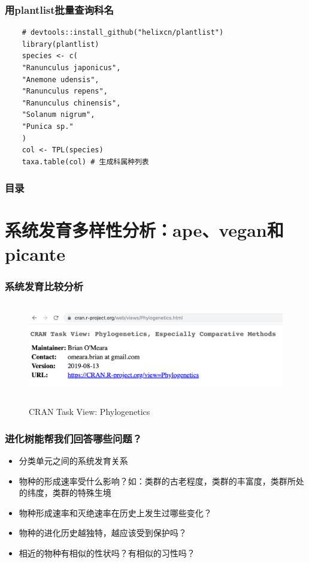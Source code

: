 \documentclass[UTF8]{ctexbeamer}
\begin{document}
    
    \begin{frame}[fragile]
    \frametitle{用plantlist批量查询科名}
     \begin{verbatim}
    # devtools::install_github("helixcn/plantlist")
    library(plantlist)
    species <- c(
    "Ranunculus japonicus",
    "Anemone udensis",
    "Ranunculus repens",
    "Ranunculus chinensis",
    "Solanum nigrum",
    "Punica sp."
    )
    col <- TPL(species)
    taxa.table(col) # 生成科属种列表
    \end{verbatim}
    \end{frame}
    

\begin{frame}
    \frametitle{目录}
    \section{系统发育多样性分析：ape、vegan和picante}
    \tableofcontents[currentsection]
    \end{frame}
    
    \begin{frame}
        \frametitle{系统发育比较分析}
        \begin{center}
        \begin{figure}
        \includegraphics[height=1.6in]{view.png}\\
        \caption{CRAN Task View: Phylogenetics}
        \end{figure}
        \end{center}
        \end{frame}
        
        \begin{frame}
        \frametitle{进化树能帮我们回答哪些问题？}
        \begin{itemize}
        \item 分类单元之间的系统发育关系
        \item 物种的形成速率受什么影响？如：类群的古老程度，类群的丰富度，类群所处的纬度，类群的特殊生境
        \item 物种形成速率和灭绝速率在历史上发生过哪些变化？
        \item 物种的进化历史越独特，越应该受到保护吗？
        \item 相近的物种有相似的性状吗？有相似的习性吗？
        \end{itemize}
        \end{frame}
        
\end{document}

